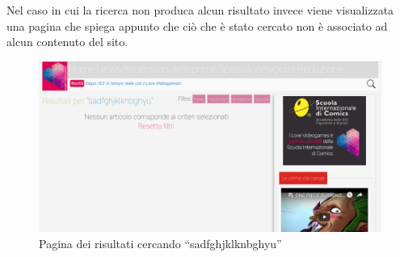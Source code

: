 \documentclass[../ProgettoTecWeb2.tex]{subfiles}
\begin{document}
	Nel caso in cui la ricerca non produca alcun risultato invece viene visualizzata una pagina che spiega appunto che ciò che è stato cercato non è associato ad alcun contenuto del sito.
	\begin{figure} [H]
		\centering
		\includegraphics[scale=0.2]{img/RicercaNoRisultati}
		\caption{Pagina dei risultati cercando ``sadfghjklknbghyu''}
	\end{figure}
\end{document}
